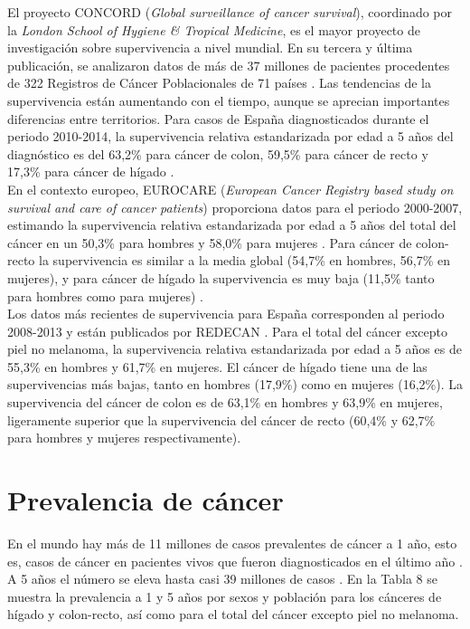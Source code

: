El proyecto CONCORD (\textit{Global surveillance of cancer survival}), coordinado por la \textit{London School of Hygiene \& Tropical Medicine}, es el mayor proyecto de investigación sobre supervivencia a nivel mundial. En su tercera y última publicación, se analizaron datos de más de 37 millones de pacientes procedentes de 322 Registros de Cáncer Poblacionales de 71 países \cite{Allemani2018}. Las tendencias de la supervivencia están aumentando con el tiempo, aunque se aprecian importantes diferencias entre territorios. Para casos de España diagnosticados durante el periodo 2010-2014, la supervivencia relativa estandarizada por edad a 5 años del diagnóstico es del 63,2\% para cáncer de colon, 59,5\% para cáncer de recto y 17,3\% para cáncer de hígado \cite{Allemani2018}.\\

En el contexto europeo, EUROCARE (\textit{European Cancer Registry based study on survival and care of cancer patients}) proporciona datos para el periodo 2000-2007, estimando la supervivencia relativa estandarizada por edad a 5 años del total del cáncer en un 50,3\% para hombres y 58,0\% para mujeres \cite{DeAngelis2014,ECIS}. Para cáncer de colon-recto la supervivencia es similar a la media global (54,7\% en hombres, 56,7\% en mujeres), y para cáncer de hígado la supervivencia es muy baja (11,5\% tanto para hombres como para mujeres) \cite{DeAngelis2014,ECIS}.\\

Los datos más recientes de supervivencia para España corresponden al periodo 2008-2013 y están publicados por REDECAN \cite{Guevara2019}. Para el total del cáncer excepto piel no melanoma, la supervivencia relativa estandarizada por edad a 5 años es de 55,3\% en hombres y 61,7\% en mujeres. El cáncer de hígado tiene una de las supervivencias más bajas, tanto en hombres (17,9\%) como en mujeres (16,2\%). La supervivencia del cáncer de colon es de 63,1\% en hombres y 63,9\% en mujeres, ligeramente superior que la supervivencia del cáncer de recto (60,4\% y 62,7\% para hombres y mujeres respectivamente).  



\section{Prevalencia de cáncer}

En el mundo hay más de 11 millones de casos prevalentes de cáncer a 1 año, esto es, casos de cáncer en pacientes vivos que fueron diagnosticados en el último año \cite{GCO}. A 5 años el número se eleva hasta casi 39 millones de casos \cite{GCO}. En la Tabla 8 se muestra la prevalencia a 1 y 5 años por sexos y población para los cánceres de hígado y colon-recto, así como para el total del cáncer excepto piel no melanoma.\\

